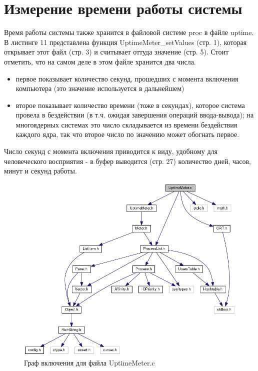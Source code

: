 \documentclass[a4paper, 12pt]{article}		%
\begin{document}
\newpage
\section{Измерение времени работы системы}

Время работы системы также хранится в файловой системе proc в файле uptime. В листинге 11 представлена функция UptimeMeter\_setValues (стр. 1), которая открывает этот файл (стр. 3) и считывает оттуда значение (стр. 5). Стоит отметить, что на самом деле в этом файле хранится два числа.

\begin{itemize}
\item первое показывает количество секунд, прошедших с момента включения компьютера (это значение используется в дальнейшем)
\item второе показывает количество времени (тоже в секундах), которое система провела в бездействии (в т.ч. ожидая завершения операций ввода-вывода); на многоядерных системах это число складывается из времени бездействия каждого ядра, так что второе число по значению может обогнать первое.
\end{itemize}

Число секунд с момента включения приводится к виду, удобному для человеческого восприятия - в буфер выводится (стр. 27) количество дней, часов, минут и секунд работы.



\begin{figure}[h!]
\centering
\includegraphics[scale=0.6]{res/uptime_meter.png}
\caption{Граф включения для файла UptimeMeter.c}
\end{figure}
\end{document}

